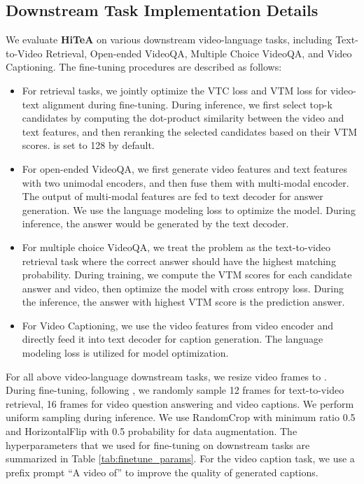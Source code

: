\documentclass[10pt,twocolumn,letterpaper]{article}
\newcommand{\modelname}{\textbf{HiTeA}\xspace}
\begin{document}
\subsection{Downstream Task Implementation Details}
We evaluate \modelname on various downstream video-language tasks, including Text-to-Video Retrieval, Open-ended VideoQA, Multiple Choice VideoQA, and Video Captioning. The fine-tuning procedures are described as follows:

\begin{itemize}\setlength{\itemsep}{-1pt}
    \item For retrieval tasks, we jointly optimize the VTC loss and VTM loss for video-text alignment during fine-tuning. During inference, we first select top-k candidates by computing the dot-product similarity between the video and text features, and then reranking the selected candidates based on their VTM scores.  is set to 128 by default.
    \item For open-ended VideoQA, we first generate video features and text features with two unimodal encoders, and then fuse them with multi-modal encoder. The output of multi-modal features are fed to text decoder for answer generation. We use the language modeling loss to optimize the model. During inference, the answer would be generated by the text decoder.
    \item For multiple choice VideoQA, we treat the problem as the text-to-video retrieval task where the correct answer should have the highest matching probability. During training, we compute the VTM scores for each candidate answer and video, then optimize the model with cross entropy loss. During the inference, the answer with highest VTM score is the prediction answer.
    \item For Video Captioning, we use the video features from video encoder and directly feed it into text decoder for caption generation. The language modeling loss is utilized for model optimization.
\end{itemize}

For all above video-language downstream tasks, we resize video frames to . During fine-tuning, following \cite{lei2022singularity, li2022alpro}, we randomly sample 12 frames for text-to-video retrieval, 16 frames for video question answering and video captions. We perform uniform sampling during inference. We use RandomCrop with minimum ratio 0.5 and HorizontalFlip with 0.5 probability for data augmentation. The hyperparameters that we used for fine-tuning on downstream tasks are summarized in Table \ref{tab:finetune_params}. For the video caption task, we use a prefix prompt “A video of” to improve the quality of generated captions.
\end{document}
